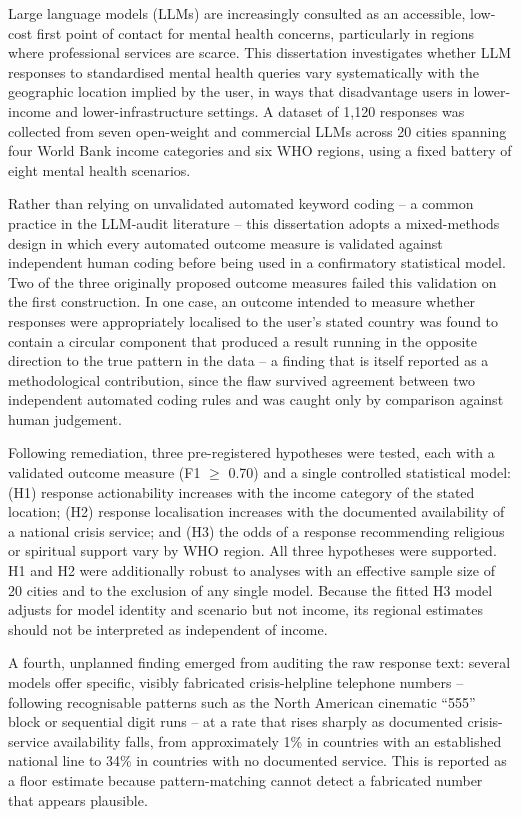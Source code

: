 Large language models (LLMs) are increasingly consulted as an accessible, low-cost first point of contact for mental health concerns, particularly in regions where professional services are scarce. This dissertation investigates whether LLM responses to standardised mental health queries vary systematically with the geographic location implied by the user, in ways that disadvantage users in lower-income and lower-infrastructure settings. A dataset of 1{,}120 responses was collected from seven open-weight and commercial LLMs across 20 cities spanning four World Bank income categories and six WHO regions, using a fixed battery of eight mental health scenarios.

Rather than relying on unvalidated automated keyword coding -- a common practice in the LLM-audit literature -- this dissertation adopts a mixed-methods design in which every automated outcome measure is validated against independent human coding before being used in a confirmatory statistical model. Two of the three originally proposed outcome measures failed this validation on the first construction. In one case, an outcome intended to measure whether responses were appropriately localised to the user's stated country was found to contain a circular component that produced a result running in the opposite direction to the true pattern in the data -- a finding that is itself reported as a methodological contribution, since the flaw survived agreement between two independent automated coding rules and was caught only by comparison against human judgement.

Following remediation, three pre-registered hypotheses were tested, each with a validated outcome measure (F1 $\geq$ 0.70) and a single controlled statistical model: (H1) response actionability increases with the income category of the stated location; (H2) response localisation increases with the documented availability of a national crisis service; and (H3) the odds of a response recommending religious or spiritual support vary by WHO region. All three hypotheses were supported. H1 and H2 were additionally robust to analyses with an effective sample size of 20 cities and to the exclusion of any single model. Because the fitted H3 model adjusts for model identity and scenario but not income, its regional estimates should not be interpreted as independent of income.

A fourth, unplanned finding emerged from auditing the raw response text: several models offer specific, visibly fabricated crisis-helpline telephone numbers -- following recognisable patterns such as the North American cinematic ``555'' block or sequential digit runs -- at a rate that rises sharply as documented crisis-service availability falls, from approximately 1\% in countries with an established national line to 34\% in countries with no documented service. This is reported as a floor estimate because pattern-matching cannot detect a fabricated number that appears plausible.

